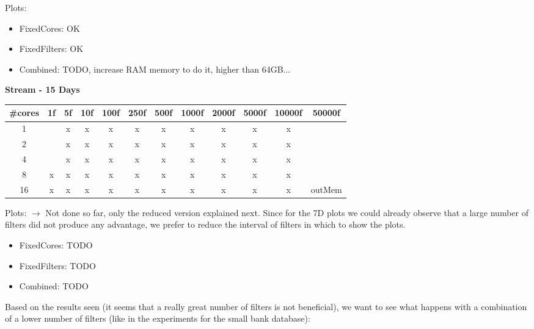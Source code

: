 \documentclass[12pt,a4paper]{article}
\begin{document}
Plots:
\begin{itemize}
    \item FixedCores: OK
    \item FixedFilters: OK
    \item Combined: TODO, increase RAM memory to do it, higher than 64GB...
\end{itemize}



\textbf{Stream - 15 Days}
\begin{table}[H]
  \begin{tabular}{|c|c|c|c|c|c|c|c|c|c|c|c|}
  \hline
  \#cores & 1f & 5f & 10f & 100f & 250f & 500f & 1000f & 2000f & 5000f & 10000f & 50000f \\ \hline
  1       &   & x & x & x & x & x & x & x & x & x &        \\ \hline
  2       &   & x & x & x & x & x & x & x & x & x &        \\ \hline
  4       &   & x & x & x & x & x & x & x & x & x &       \\ \hline
  8       & x & x & x & x & x & x & x & x & x & x &        \\ \hline
  16      & x & x & x & x & x & x & x & x & x & x & outMem \\ \hline
  \end{tabular}
\end{table}

Plots:
$\rightarrow$ Not done so far, only the reduced version explained next. Since for the 7D plots
we could already observe that a large number of filters did not produce any advantage, we prefer
to reduce the interval of filters in which to show the plots.
\begin{itemize}
    \item FixedCores: TODO
    \item FixedFilters: TODO
    \item Combined: TODO
\end{itemize}
  

Based on the results seen (it seems that a really great number of filters is not beneficial), we want to see what happens with a combination of a lower number of filters (like in the experiments for the small bank database):
\end{document}
